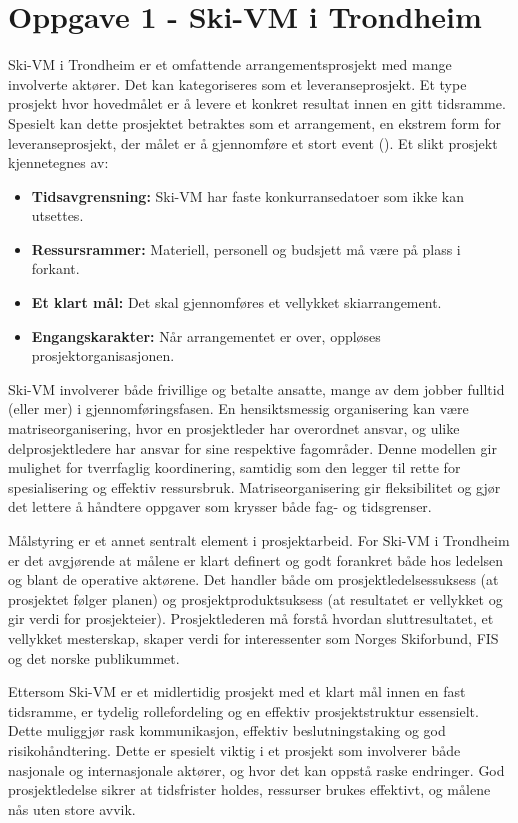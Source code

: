 \section{Oppgave 1 - Ski-VM i Trondheim}

Ski-VM i Trondheim er et omfattende arrangementsprosjekt med mange involverte aktører. Det kan kategoriseres som et leveranseprosjekt. Et type prosjekt hvor hovedmålet er å levere et konkret resultat innen en gitt tidsramme. Spesielt kan dette prosjektet betraktes som et arrangement, en ekstrem form for leveranseprosjekt, der målet er å gjennomføre et stort event (\cite{torvatn, 2024}). Et slikt prosjekt kjennetegnes av:
\begin{itemize}
    \item \textbf{Tidsavgrensning:} Ski-VM har faste konkurransedatoer som ikke kan utsettes.
    \item \textbf{Ressursrammer:} Materiell, personell og budsjett må være på plass i forkant.
    \item \textbf{Et klart mål:} Det skal gjennomføres et vellykket skiarrangement.
    \item \textbf{Engangskarakter:} Når arrangementet er over, oppløses prosjektorganisasjonen.
\end{itemize}

Ski-VM involverer både frivillige og betalte ansatte, mange av dem jobber fulltid (eller mer) i gjennomføringsfasen. En hensiktsmessig organisering kan være matriseorganisering, hvor en prosjektleder har overordnet ansvar, og ulike delprosjektledere har ansvar for sine respektive fagområder. Denne modellen gir mulighet for tverrfaglig koordinering, samtidig som den legger til rette for spesialisering og effektiv ressursbruk. Matriseorganisering gir fleksibilitet og gjør det lettere å håndtere oppgaver som krysser både fag- og tidsgrenser.

Målstyring er et annet sentralt element i prosjektarbeid. For Ski-VM i Trondheim er det avgjørende at målene er klart definert og godt forankret både hos ledelsen og blant de operative aktørene. Det handler både om prosjektledelsessuksess (at prosjektet følger planen) og prosjektproduktsuksess (at resultatet er vellykket og gir verdi for prosjekteier). Prosjektlederen må forstå hvordan sluttresultatet, et vellykket mesterskap, skaper verdi for interessenter som Norges Skiforbund, FIS og det norske publikummet.

Ettersom Ski-VM er et midlertidig prosjekt med et klart mål innen en fast tidsramme, er tydelig rollefordeling og en effektiv prosjektstruktur essensielt. Dette muliggjør rask kommunikasjon, effektiv beslutningstaking og god risikohåndtering. Dette er spesielt viktig i et prosjekt som involverer både nasjonale og internasjonale aktører, og hvor det kan oppstå raske endringer. God prosjektledelse sikrer at tidsfrister holdes, ressurser brukes effektivt, og målene nås uten store avvik.

